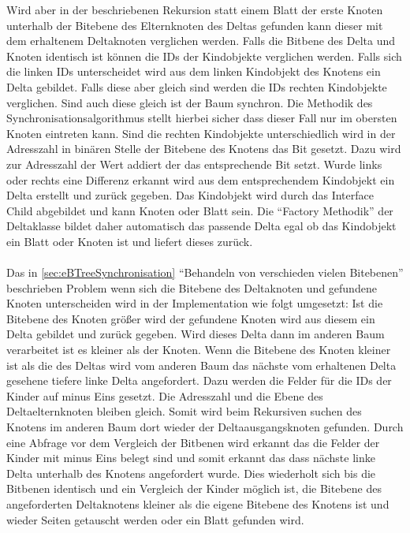 \documentclass[a4paper,11pt,oneside,%
headsepline,												%
footsepline,												%
bibtotocnumbered									%
]{scrreprt}
\begin{document}
Wird aber in der beschriebenen Rekursion statt einem Blatt der erste Knoten unterhalb der Bitebene des Elternknoten des Deltas gefunden kann dieser mit dem erhaltenem Deltaknoten verglichen werden. Falls die Bitbene des Delta und Knoten identisch ist können die \ac{ID}s der Kindobjekte verglichen werden. Falls sich die linken \ac{ID}s unterscheidet wird aus dem linken Kindobjekt des Knotens ein Delta gebildet. Falls diese aber gleich sind werden die \ac{ID}s rechten Kindobjekte verglichen. Sind auch diese gleich ist der Baum synchron. Die Methodik des Synchronisationsalgorithmus stellt hierbei sicher dass dieser Fall nur im obersten Knoten eintreten kann. Sind die rechten Kindobjekte unterschiedlich wird in der Adresszahl in binären Stelle der Bitebene des Knotens das Bit gesetzt. Dazu wird zur Adresszahl der Wert addiert der das entsprechende Bit setzt. Wurde links oder rechts eine Differenz erkannt wird aus dem entsprechendem Kindobjekt ein Delta erstellt und zurück gegeben. Das Kindobjekt wird durch das Interface Child abgebildet und kann Knoten oder Blatt sein. Die \enquote{Factory Methodik} der Deltaklasse bildet daher automatisch das passende Delta egal ob das Kindobjekt ein Blatt oder Knoten ist und liefert dieses zurück.\\\\
Das in \autoref{sec:eBTreeSynchronisation} \enquote{Behandeln von verschieden vielen Bitebenen} beschrieben Problem wenn sich die Bitebene des Deltaknoten und gefundene Knoten unterscheiden wird in der Implementation wie folgt umgesetzt: Ist die Bitebene des Knoten größer wird der gefundene Knoten wird aus diesem ein Delta gebildet und zurück gegeben. Wird dieses Delta dann im anderen Baum verarbeitet ist es kleiner als der Knoten. Wenn die Bitebene des Knoten kleiner ist als die des Deltas wird vom anderen Baum das nächste vom erhaltenen Delta gesehene tiefere linke Delta angefordert. Dazu werden die Felder für die \ac{ID}s der Kinder auf minus Eins gesetzt. Die Adresszahl und die Ebene des Deltaelternknoten bleiben gleich. Somit wird beim Rekursiven suchen des Knotens im anderen Baum dort wieder der Deltaausgangsknoten gefunden. Durch eine Abfrage vor dem Vergleich der Bitbenen wird erkannt das die Felder der Kinder mit minus Eins belegt sind und somit erkannt das dass nächste linke Delta unterhalb des Knotens angefordert wurde. Dies wiederholt sich bis die Bitbenen identisch und ein Vergleich der Kinder möglich ist, die Bitebene des angeforderten Deltaknotens kleiner als die eigene Bitebene des Knotens ist und wieder Seiten getauscht werden oder ein Blatt gefunden wird.\\\\
\end{document}

